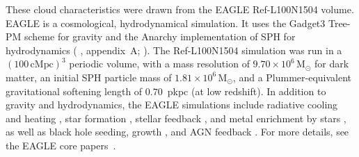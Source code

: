 \documentclass[fleqn,usenatbib]{mnras}
\begin{document}
These cloud characteristics were drawn from the EAGLE Ref-L100N1504 volume.
EAGLE \citep[`Evolution and Assembly of GaLaxies and their Environments';][]{Schaye2015,Crain2015,McAlpine2016} is a cosmological, hydrodynamical simulation.
It uses the Gadget3 Tree-PM scheme for gravity \citep[][]{Springel2005} and the Anarchy implementation of SPH for hydrodynamics (\citeauthor{Schaye2015} \citeyear{Schaye2015}, appendix~A; \citeauthor{Schaller2015} \citeyear{Schaller2015}).
The Ref-L100N1504 simulation was run in a $(100\,\mathrm{cMpc})^3$ periodic volume, with a mass resolution of $9.70 \times 10^6 \,\mathrm{M}_{\odot}$ for dark matter, an initial SPH particle mass of $1.81 \times 10^6 \,\mathrm{M}_{\odot}$, and a Plummer-equivalent gravitational softening length of $0.70$~pkpc (at low redshift).
In addition to gravity and hydrodynamics, the EAGLE simulations include radiative cooling and heating \citep{Wiersma2009a}, star formation \citep{Schaye2004, Schaye2008}, stellar feedback \citep{DallaVecchia2012}, and metal enrichment by stars \citep{Wiersma2009}, as well as black hole seeding, growth \citep{Rosas-Guevara2015}, and AGN feedback \citep{Booth2009}.
For more details, see the EAGLE core papers~\citep{Schaye2015,Crain2015,McAlpine2016}.
\end{document}
